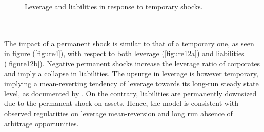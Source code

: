 \documentclass[11pt]{article}
\begin{document}
\begin{figure}[h!]
\centering
{}\quad
{}
 \caption{Leverage and liabilities in response to temporary shocks.} \label{figure12}
\end{figure}\\\\
The impact of a permanent shock is similar to that of a temporary one, as seen in figure (\ref{figure4}), with respect to both leverage (\ref{figure12a}) and liabilities (\ref{figure12b}). Negative permanent shocks increase the leverage ratio of corporates and imply a collapse in liabilities. The upsurge in leverage is however temporary, implying a mean-reverting tendency of leverage towards its long-run steady state level, as documented by \cite{15}. On the contrary, liabilities are permanently downsized due to the permanent shock on assets. Hence, the model is consistent with observed regularities on leverage mean-reversion and long run absence of arbitrage opportunities.
\end{document}
